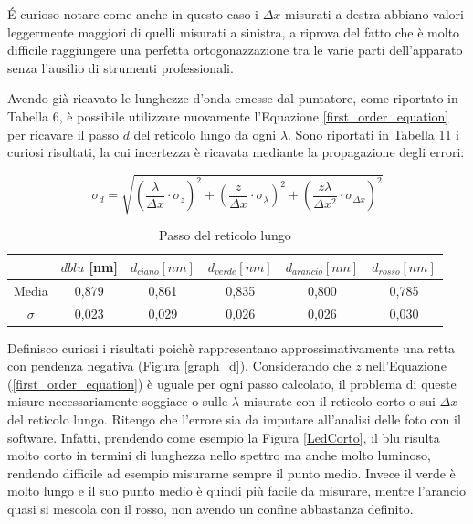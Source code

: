 \documentclass{article}
\begin{document}
É curioso notare come anche in questo caso i $\Delta x$ misurati a destra abbiano valori leggermente maggiori di quelli misurati a sinistra, a riprova del fatto che è molto difficile raggiungere una perfetta ortogonazzazione tra le varie parti dell'apparato senza l'ausilio di strumenti professionali.

\vspace{3mm}

Avendo già ricavato le lunghezze d'onda emesse dal puntatore, come riportato in Tabella 6, è possibile utilizzare nuovamente l'Equazione \ref{first_order_equation} per ricavare il passo $d$ del reticolo lungo da ogni $\lambda$. Sono riportati in Tabella 11 i curiosi risultati, la cui incertezza è ricavata mediante la propagazione degli errori:

\begin{equation}
    \sigma_d = \sqrt{\left(\frac{\lambda}{\Delta x}\cdot\sigma_z\right)^2 + \left(\frac{z}{\Delta x}\cdot\sigma_\lambda\right)^2 + \left(\frac{z \lambda}{\Delta x^2}\cdot\sigma_{\Delta x}\right)^2}
\end{equation}

\begin{table}[h]
    \centering
\begin{tabular}{||c|c|c|c|c|c||}
    \hline
     & \cellcolor{blue}$d{blu}$ [nm] & \cellcolor{cyan}$d_{ciano} [nm]$ & \cellcolor{green}$d_{verde}[nm]$ & \cellcolor{orange}$d_{arancio}[nm]$ & \cellcolor{red}$d_{rosso}[nm]$ \\
    \hline
    Media & 0,879 & 0,861 & 0,835 & 0,800 & 0,785 \\
    $\sigma$ & 0,023 & 0,029 & 0,026 & 0,026 & 0,030\\
    \hline
\end{tabular}
\caption{Passo del reticolo lungo}
\end{table}

Definisco curiosi i risultati poichè rappresentano approssimativamente una retta con pendenza negativa (Figura \ref{graph_d}). Considerando che $z$ nell'Equazione (\ref{first_order_equation}) è uguale per ogni passo calcolato, il problema di queste misure necessariamente soggiace o sulle $\lambda$ misurate con il reticolo corto o sui $\Delta x$ del reticolo lungo. Ritengo che l'errore sia da imputare all'analisi delle foto con il software. Infatti, prendendo come esempio la Figura \ref{LedCorto}, il blu risulta molto corto in termini di lunghezza nello spettro ma anche molto luminoso, rendendo difficile ad esempio misurarne sempre il punto medio. Invece il verde è molto lungo e il suo punto medio è quindi più facile da misurare, mentre l'arancio quasi si mescola con il rosso, non avendo un confine abbastanza definito.
\end{document}
